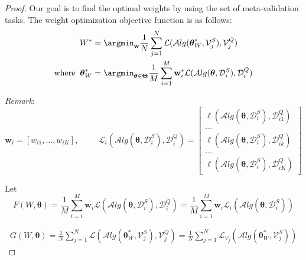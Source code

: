 \begin{proof}
Our goal is to find the optimal weights by using the set of meta-validation tasks. The weight optimization objective function is as follows:
\begin{equation*}
    \begin{aligned}
     {W}^{*} &= \argmin_{\mathbf{w}} \frac{1}{N} \sum_{j=1}^{N}\mathcal{L}(\mathcal{A}lg(\boldsymbol{\theta}^{*}_{W}, \mathcal{V}_{j}^{S}), \mathcal{V}_{j}^{Q}) 
     \\
    \text{where\hspace{2mm}} \boldsymbol{\theta}^{*}_{W} &= \argmin_{\boldsymbol{\theta} \in \boldsymbol{\Theta}} \frac{1}{M}\sum_{i=1}^{M}\mathbf{w}_{i}^{*}\mathcal{L}(\mathcal{A}lg(\boldsymbol{\theta}, \mathcal{D}_i^{S}), \mathcal{D}_i^{Q})
    \end{aligned}
\end{equation*}

\textit{Remark}:
$$
\mathbf{w}_{i} = [w_{i1}, \dots, w_{iK}], \hspace{1cm} \mathcal{L}_{i}(\mathcal{A}lg(\boldsymbol{\theta}, \mathcal{D}_{i}^{S}), \mathcal{D}_{i}^{Q}) = \begin{bmatrix} \ell(\mathcal{A}lg(\boldsymbol{\theta}, \mathcal{D}_{i}^{S}), \mathcal{D}_{i1}^{Q}) \\ \dots \\ \ell(\mathcal{A}lg(\boldsymbol{\theta}, \mathcal{D}_{i}^{S}), \mathcal{D}_{ik}^{Q}) \\ \dots \\ \ell(\mathcal{A}lg(\boldsymbol{\theta}, \mathcal{D}_{i}^{S}), \mathcal{D}_{iK}^{Q}) \end{bmatrix} 
$$

Let 
\begin{equation}
F(W, \boldsymbol{\theta}) =
\frac{1}{M}\sum_{i=1}^{M}\mathbf{w}_{i}\mathcal{L}(\mathcal{A}lg(\boldsymbol{\theta}, \mathcal{D}_i^{S}), \mathcal{D}_i^{Q})
= \frac{1}{M}\sum_{i=1}^{M}\mathbf{w}_{i}\mathcal{L}_i(\mathcal{A}lg(\boldsymbol{\theta}, \mathcal{D}_i^{S}))
\end{equation}

\begin{equation}
\begin{aligned}
G(W, \boldsymbol{\theta}) = \frac{1}{N} \sum_{j=1}^{N}\mathcal{L}(\mathcal{A}lg(\boldsymbol{\theta}^{*}_{W}, \mathcal{V}_{j}^{S}), \mathcal{V}_{j}^{Q})  = \frac{1}{N} \sum_{j=1}^{N}\mathcal{L}_{V_j}(\mathcal{A}lg(\boldsymbol{\theta}^{*}_{W}, \mathcal{V}_{j}^{S}))
\end{aligned}
\end{equation}
 


\end{proof}
